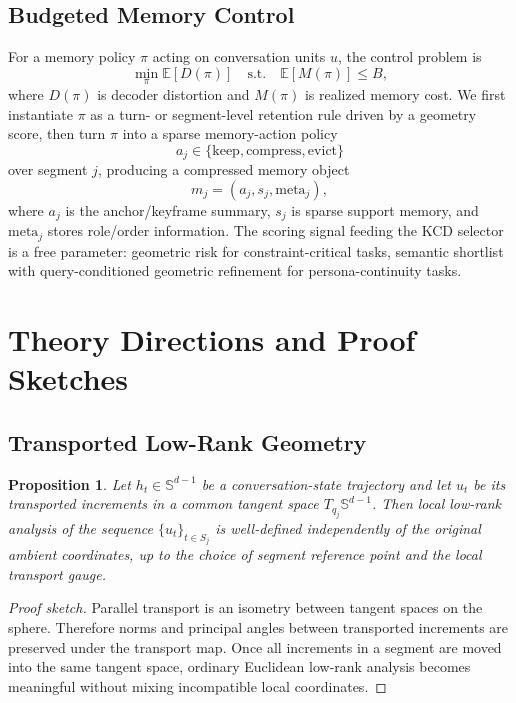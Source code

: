 \documentclass[conference]{IEEEtran}
\newtheorem{proposition}{Proposition}
\newcommand{\Sph}{\mathbb{S}}
\newcommand{\E}{\mathbb{E}}
\begin{document}
\subsection{Budgeted Memory Control}
For a memory policy $\pi$ acting on conversation units $u$, the control problem is
\begin{equation}
\min_\pi \E\!\left[D(\pi)\right]
\quad
\text{s.t.}
\quad
\E\!\left[M(\pi)\right] \leq B,
\end{equation}
where $D(\pi)$ is decoder distortion and $M(\pi)$ is realized memory cost. We first instantiate $\pi$ as a turn- or segment-level retention rule driven by a geometry score, then turn $\pi$ into a sparse memory-action policy
\begin{equation}
a_j \in \{\mathrm{keep}, \mathrm{compress}, \mathrm{evict}\}
\end{equation}
over segment $j$, producing a compressed memory object
\begin{equation}
m_j = (a_j, s_j, \mathrm{meta}_j),
\end{equation}
where $a_j$ is the anchor/keyframe summary, $s_j$ is sparse support memory, and $\mathrm{meta}_j$ stores role/order information. The scoring signal feeding the KCD selector is a free parameter: geometric risk for constraint-critical tasks, semantic shortlist with query-conditioned geometric refinement for persona-continuity tasks.

\section{Theory Directions and Proof Sketches}
\subsection{Transported Low-Rank Geometry}
\begin{proposition}
Let $h_t \in \Sph^{d-1}$ be a conversation-state trajectory and let $u_t$ be its transported increments in a common tangent space $T_{q_j}\Sph^{d-1}$. Then local low-rank analysis of the sequence $\{u_t\}_{t \in S_j}$ is well-defined independently of the original ambient coordinates, up to the choice of segment reference point and the local transport gauge.
\end{proposition}

\begin{proof}[Proof sketch]
Parallel transport is an isometry between tangent spaces on the sphere. Therefore norms and principal angles between transported increments are preserved under the transport map. Once all increments in a segment are moved into the same tangent space, ordinary Euclidean low-rank analysis becomes meaningful without mixing incompatible local coordinates.
\end{proof}
\end{document}
